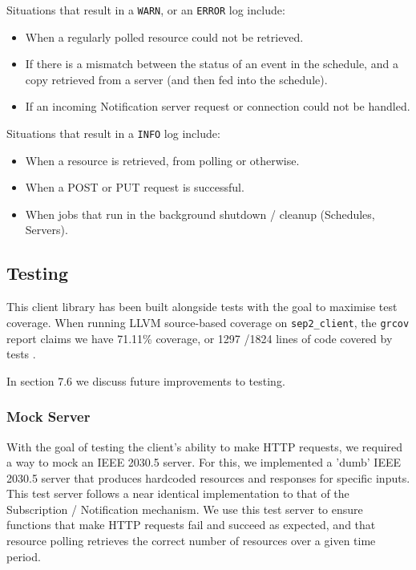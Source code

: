 Situations that result in a \texttt{WARN}, or an \texttt{ERROR} log include:

\begin{itemize}
    \item When a regularly polled resource could not be retrieved.
    \item If there is a mismatch between the status of an event in the schedule, and a copy retrieved from a server (and then fed into the schedule).
    \item If an incoming Notification server request or connection could not be handled.
\end{itemize}

Situations that result in a \texttt{INFO} log include:

\begin{itemize}
    \item When a resource is retrieved, from polling or otherwise.
    \item When a POST or PUT request is successful.
    \item When jobs that run in the background shutdown / cleanup (Schedules, Servers).
\end{itemize}

\subsection{Testing}
This client library has been built alongside tests with the goal to maximise test coverage. When running LLVM source-based coverage on \texttt{sep2\_client}, the \texttt{grcov} report claims we have 71.11\% coverage, or 1297 \slash 1824 lines of code covered by tests \cite{grcov} \cite{llvmcov}. 

In section 7.6 we discuss future improvements to testing.

\subsubsection{Mock Server}
With the goal of testing the client's ability to make HTTP requests, we required a way to mock an IEEE 2030.5 server. For this, we implemented a 'dumb' IEEE 2030.5 server that produces hardcoded resources and responses for specific inputs. This test server follows a near identical implementation to that of the Subscription / Notification mechanism. We use this test server to ensure functions that make HTTP requests fail and succeed as expected, and that resource polling retrieves the correct number of resources over a given time period. 

